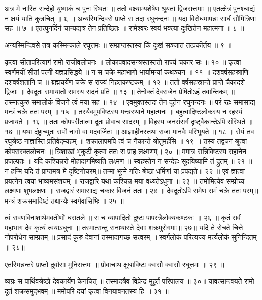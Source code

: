 अत्र मे नास्ति सन्देहो युष्माकं च पुनः स्थितः ॥
ततो वक्ष्याम्यशेषेण श्रूयतां द्विजसत्तमाः ॥
एतत्क्षेत्रं पुनश्चाद्यं न क्षयं याति कुत्रचित् ॥ ६ ॥
अन्यस्मिन्दिवसे प्राप्ते स तदा रघुनन्दनः ॥
यदा विरोधमापन्नः सार्धं सौमित्रिणा सह ॥ ७ ॥
एतत्पुनर्दिनं चान्यद्यत्र तेन प्रतिष्ठितः ॥
रामेश्वरः स्वयं भक्त्या दुःखितेन महात्मना ॥ ८ ॥

अन्यस्मिन्दिवसे तत्र कस्मिन्काले रघूत्तमः ॥
सम्प्राप्तस्तस्य किं दुःखं सञ्जातं तत्प्रकीर्तय ॥ ९ ॥

कृत्वा सीतापरित्यागं रामो राजीवलोचनः ॥
लोकापवादसन्त्रस्तस्ततो राज्यं चकार सः ॥ १० ॥
कृत्वा स्वर्णमयीं सीतां पत्नीं यज्ञप्रसिद्धये ॥
न स चक्रे महाभागो भार्यामन्यां कथञ्चन ॥ ११ ॥
दशवर्षसहस्राणि दशवर्षशतानि च ॥
ब्रह्मचर्येण चक्रे स राज्यं निहतकण्टकम् ॥ १२ ॥
ततो वर्षसहस्रान्ते प्राप्ते चैकादशे द्विजाः ॥
देवदूतः समायातो रामस्य सदनं प्रति ॥ १३ ॥
तेनोक्तं देवराजेन प्रेषितोऽहं तवान्तिकम् ॥
तस्मात्कुरु समालोकं विजने त्वं मया सह ॥ १४ ॥
एवमुक्तस्तदा तेन दूतेन रघुनन्दनः ॥
परं रहः समासाद्य मन्त्रं चक्रे ततः परम् ॥ १५ ॥
तस्यैवमुपविष्टस्य मन्त्रस्थाने महात्मनः ॥
बहुत्वादिष्टलोकस्य न रहस्यं प्रजायते ॥ १६ ॥
ततः कोपपरीतात्मा दूतः प्रोवाच सादरम् ॥
विहस्य जनसंसर्गं दृष्ट्वैकान्तेऽपि संस्थिते ॥ १७ ॥
यथा दंष्ट्राच्युतः सर्पो नागो वा मदवर्जितः ॥
आज्ञाहीनस्तथा राजा मानवैः परिभूयते ॥ १८ ॥
सेयं तव रघुश्रेष्ठ नाज्ञास्ति प्रतिवेद्म्यहम् ॥
शक्रालापमपि त्वं च नैकान्ते श्रोतुमर्हसि ॥ १९ ॥
तस्य तद्वचनं श्रुत्वा कोपसंरक्तलोचनः ॥
त्रिशाखां भृकुटीं कृत्वा ततः स प्राह लक्ष्मणम्॥ २० ॥
ममात्र सन्निविष्टस्य सहानेन प्रजल्पतः ॥
यदि कश्चिन्नरो मोहादागमिष्यति लक्ष्मण ॥
स्वहस्तेन न सन्देहः सूदयिष्यामि तं द्रुतम् ॥ २१ ॥
न हन्मि यदि तं प्राप्तमत्र मे दृष्टिगोचरम्॥
तन्मा भून्मे गतिः श्रेष्ठा धर्मिणां या प्रपद्यते॥ २२ ॥
एवं ज्ञात्वा प्रयत्नेन त्वया भाव्यमसंशयम् ॥
राजद्वारि यथा कश्चिन्न मया वध्यतेऽधुना ॥ २३ ॥
तमोमित्येव सम्प्रोच्य लक्ष्मणः शुभलक्षणः ॥
राजद्वारं समासाद्य चकार विजनं ततः॥ २४ ॥
देवदूतोऽपि रामेण समं चक्रे ततः परम्॥
मन्त्रं शक्रसमादिष्टं तथान्यैः स्वर्गवासिभिः ॥ २५ ॥

त्वं रावणविनाशार्थमवतीर्णो धरातले ॥
स च व्यापादितो दुष्टः पापस्त्रैलोक्यकण्टकः ॥ २६ ॥
कृतं सर्वं महाभाग देव कृत्यं त्वयाऽधुना ॥
तस्मात्सन्तु सनाथास्ते देवाः शक्रपुरोगमाः॥ २७॥
यदि ते रोचते चित्ते नोपरोधेन साम्प्रतम् ॥
प्रसादं कुरु देवानां तस्मादागच्छ सत्वरम् ॥
स्वर्गलोकं परित्यज्य मर्त्यलोकं सुनिन्दितम् ॥ २८॥

एतस्मिन्नन्तरे प्राप्तो दुर्वासा मुनिसत्तमः ॥
प्रोवाचाथ क्षुधाविष्टः क्वासौ क्वासौ रघूत्तमः ॥ २९ ॥

व्यग्रः स पार्थिवश्रेष्ठो देवकार्येण केनचित् ॥
तस्मादत्रैव विप्रेन्द्र मुहूर्तं परिपालय ॥ ३०॥
यावत्सान्त्वयते रामो दूतं शक्रसमुद्भवम् ॥
ममोपरि दयां कृत्वा विनयावनतस्य हि ॥ ३१ ॥

